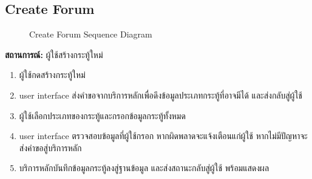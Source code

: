 \subsection{Create Forum}
\begin{figure}[H]\centering
    \setlength{\fboxrule}{0.2mm} %
    \caption{Create Forum Sequence Diagram}\label{fig:createForumSeqDiagram}
\end{figure}
\textbf{สถานการณ์: }ผู้ใช้สร้างกระทู้ใหม่
\begin{enumerate}
    \item ผู้ใช้กดสร้างกระทู้ใหม่
    \item user interface ส่งคำขอจากบริการหลักเพื่อดึงข้อมูลประเภทกระทู้ที่อาจมีได้ และส่งกลับสู่ผู้ใช้
    \item ผู้ใช้เลือกประเภทของกระทู้และกรอกข้อมูลกระทู้ทั้งหมด
    \item user interface ตรวจสอบข้อมูลที่ผู้ใช้กรอก หากผิดพลาดจะแจ้งเตือนแก่ผู้ใช้ หากไม่มีปัญหาจะส่งคำขอสู่บริการหลัก
    \item บริการหลักบันทึกข้อมูลกระทู้ลงสู่ฐานข้อมูล และส่งสถานะกลับสู่ผู้ใช้ พร้อมแสดงผล
\end{enumerate}

